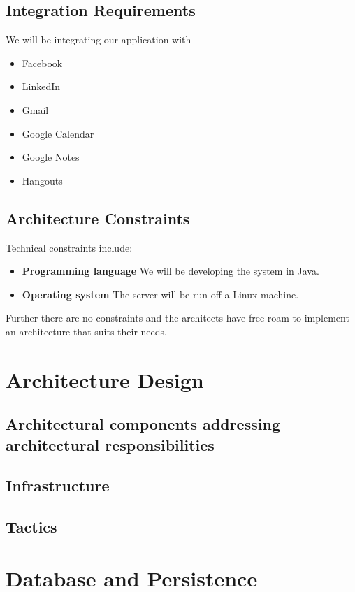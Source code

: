 \documentclass[hidelinks,english]{article}
\begin{document}
		
		\subsection{Integration Requirements}
		We will be integrating our application with
		\begin{itemize}
			\item Facebook
			\item LinkedIn
			\item Gmail
			\item Google Calendar
			\item Google Notes
			\item Hangouts
		\end{itemize}
		
		\subsection{Architecture Constraints}
			Technical constraints include:
			\begin{itemize}
				\item \textbf{Programming language} We will be developing the system in Java.
				\item \textbf{Operating system} The server will be run off a Linux machine. 
			\end{itemize}
			Further there are no constraints and the architects have free roam to implement an architecture that suits their needs.
			
	\section{Architecture Design}
	
		\subsection{Architectural components addressing architectural responsibilities}
		
		\subsection{Infrastructure}
		
		\subsection{Tactics}
		
	\section{Database and Persistence}
	
\end{document}
